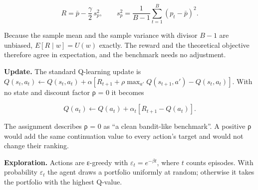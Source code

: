 \documentclass[
  11pt]{article}
\begin{document}
\[R = \bar{p} - \frac{\gamma}{2}\, s_p^2, \qquad s_p^2 = \frac{1}{B-1}\sum_{t=1}^{B} (p_t - \bar{p})^2 .\]

Because the sample mean and the sample variance with divisor \(B-1\) are
unbiased, \(E[R \mid w] = U(w)\) exactly. The reward and the theoretical
objective therefore agree in expectation, and the benchmark needs no
adjustment.

\textbf{Update.} The standard Q-learning update is
\(Q(s_t,a_t) \leftarrow Q(s_t,a_t) + \alpha\left[R_{t+1} + \rho \max_{a'} Q(s_{t+1},a') - Q(s_t,a_t)\right]\).
With no state and discount factor ρ = 0 it becomes

\[Q(a_t) \leftarrow Q(a_t) + \alpha_t \left[ R_{t+1} - Q(a_t) \right].\]

The assignment describes ρ = 0 as ``a clean bandit-like benchmark''. A
positive ρ would add the same continuation value to every action's
target and would not change their ranking.

\textbf{Exploration.} Actions are ε-greedy with
\(\varepsilon_t = e^{-\beta t}\), where \(t\) counts episodes. With
probability \(\varepsilon_t\) the agent draws a portfolio uniformly at
random; otherwise it takes the portfolio with the highest Q-value.
\end{document}
